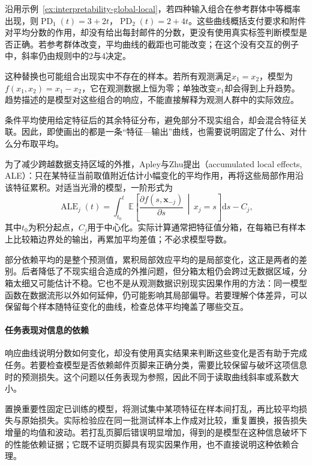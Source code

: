 沿用示例~\ref{ex:interpretability-global-local}，若四种输入组合在参考群体中等概率出现，则$\operatorname{PD}_1(t)=3+2t$，$\operatorname{PD}_2(t)=2+4t$。这些曲线概括支付要求和附件对平均分数的作用，却没有给出每封邮件的分数，更没有使用真实标签判断模型是否正确。若参考群体改变，平均曲线的截距也可能改变；在这个没有交互的例子中，斜率仍由规则中的2与4决定。

这种替换也可能组合出现实中不存在的样本。若所有观测满足$x_1=x_2$，模型为$f(x_1,x_2)=x_1-x_2$，它在观测数据上恒为零；单独改变$x_1$却会得到上升趋势。趋势描述的是模型对这些组合的响应，不能直接解释为观测人群中的实际效应。

条件平均使用给定特征后的其余特征分布，避免部分不现实组合，却会混合特征关联。因此，即使画出的都是一条“特征—输出”曲线，也需要说明固定了什么、对什么分布取平均。

为了减少跨越数据支持区域的外推，Apley与Zhu提出（accumulated local effects, ALE）：只在某特征当前取值附近估计小幅变化的平均作用，再将这些局部作用沿该特征累积。对适当光滑的模型，一阶形式为
\begin{equation}
 \operatorname{ALE}_j(t)
 =\int_{t_0}^{t}
 \mathbb E\!\left[
 \frac{\partial f(s,\bm{x}_{-j})}{\partial s}
 \,\middle|\,x_j=s\right]\mathrm ds-C_j,
 \label{eq:interpretability-ale}
\end{equation}
其中$t_0$为积分起点，$C_j$用于中心化。实际计算通常把特征值分箱，在每箱已有样本上比较箱边界处的输出，再累加平均差值；不必求模型导数。

部分依赖平均的是整个预测值，累积局部效应平均的是局部变化，这正是两者的差别。后者降低了不现实组合造成的外推问题，但分箱太粗仍会跨过无数据区域，分箱太细又可能估计不稳。它也不是从观测数据识别现实因果作用的方法：同一模型函数在数据流形以外如何延伸，仍可能影响其局部偏导。若要理解个体差异，可以保留每个样本随特征变化的曲线，检查总体平均掩盖了哪些交互。

\paragraph{任务表现对信息的依赖}

响应曲线说明分数如何变化，却没有使用真实结果来判断这些变化是否有助于完成任务。若要检查模型是否依赖邮件页脚来正确分类，需要比较保留与破坏这项信息时的预测损失。这个问题以任务表现为参照，因此不同于读取曲线斜率或系数大小。

置换重要性固定已训练的模型，将测试集中某项特征在样本间打乱，再比较平均损失与原始损失。实际检验应在同一批测试样本上作成对比较，重复置换，报告损失增量的均值和波动。若打乱页脚后错误明显增加，得到的是模型在这种信息破坏下的性能依赖证据；它既不证明页脚具有现实因果作用，也不直接说明这种依赖合理。

